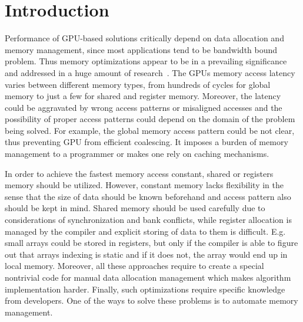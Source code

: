 \documentclass[sigplan]{acmart}\settopmatter{}
\begin{document}




\maketitle


\section{Introduction}

Performance of GPU-based solutions critically depend on data allocation and memory management, since most applications tend to be bandwidth bound problem.
Thus memory optimizations appear to be in a prevailing significance and addressed in a huge amount of research~\cite{10.1007/978-3-319-74313-4_27, Xie2018ICCADU, zhang2019efficient}.
The GPUs memory access latency varies between different memory types, from hundreds of cycles for global memory to just a few for shared and register memory.
Moreover, the latency could be aggravated by wrong access patterns or misaligned accesses and the possibility of proper access patterns could depend on the domain of the problem being solved.
For example, the global memory access pattern could be not clear, thus preventing GPU from efficient coalescing.
It imposes a burden of memory management to a programmer or makes one rely on caching mechanisms.

In order to achieve the fastest memory access constant, shared or registers memory should be utilized.
However, constant memory lacks flexibility in the sense that the size of data should be known beforehand and access pattern also should be kept in mind.
Shared memory should be used carefully due to considerations of synchronization and bank conflicts, while register allocation is managed by the compiler and explicit storing of data to them is difficult.
E.g. small arrays could be stored in registers, but only if the compiler is able to figure out that arrays indexing is static and if it does not, the array would end up in local memory.
Moreover, all these approaches require to create a special nontrivial code for manual data allocation management which makes algorithm implementation harder.
Finally, such optimizations require specific knowledge from developers.
One of the ways to solve these problems is to automate memory management.
\end{document}
